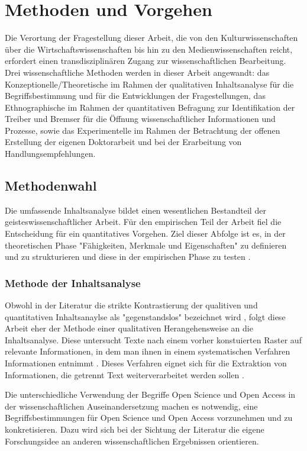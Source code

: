\chapter{Methoden und Vorgehen}
Die Verortung der Fragestellung dieser Arbeit, die von den Kulturwissenschaften über die Wirtschaftswissenschaften bis hin zu den Medienwissenschaften reicht, erfordert einen transdisziplinären Zugang zur wissenschaftlichen Bearbeitung. Drei wissenschaftliche Methoden werden in dieser Arbeit angewandt: das Konzeptionelle/Theoretische im Rahmen der qualitativen Inhaltsanalyse für die Begriffsbestimmung und für die Entwicklungen der Fragestellungen, das Ethnographische im Rahmen der quantitativen Befragung zur Identifikation der Treiber und Bremser für die Öffnung wissenschaftlicher Informationen und Prozesse, sowie das Experimentelle im Rahmen der Betrachtung der offenen Erstellung der eigenen Doktorarbeit und bei der Erarbeitung von Handlungsempfehlungen.

\section{Methodenwahl}

Die umfassende Inhaltsanalyse bildet einen wesentlichen Bestandteil der geisteswissenschaftlicher Arbeit. Für den empirischen Teil der Arbeit fiel die Entscheidung für ein quantitatives Vorgehen. Ziel dieser Abfolge ist es, in der theoretischen Phase "Fähigkeiten, Merkmale und Eigenschaften" zu definieren und zu strukturieren und diese in der empirischen Phase zu testen \cite{raab_2012_fragebogen}.

\subsection{Methode der Inhaltsanalyse}
Obwohl in der Literatur die strikte Kontrastierung der qualitiven und quantitativen Inhaltsanaylse als "gegenstandslos" bezeichnet wird \cite{frueh_2011_inhaltsanalyse}, folgt diese Arbeit eher der Methode einer qualitativen Herangehensweise an die Inhaltsanalyse. Diese untersucht Texte nach einem vorher konstuierten Raster auf relevante Informationen, in dem man ihnen in einem systematischen Verfahren Informationen entnimmt \cite{glaser_1999_theorie_analyse}. Dieses Verfahren eignet sich für die Extraktion von Informationen, die getrennt Text weiterverarbeitet werden sollen \cite{glaser_1999_theorie_analyse}.

Die unterschiedliche Verwendung der Begriffe Open Science und Open Access in der wissenschaftlichen Auseinandersetzung machen es notwendig, eine Begriffsbestimmungen für Open Science und Open Access vorzunehmen und zu konkretisieren. Dazu wird sich bei der Sichtung der Literatur die eigene Forschungsidee an anderen wissenschaftlichen Ergebnissen orientieren.

